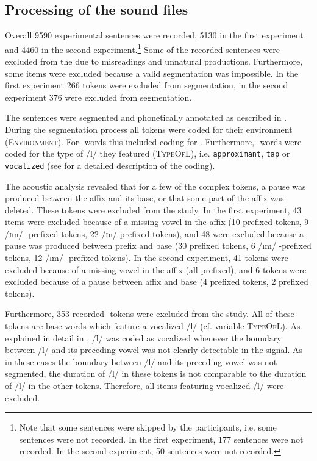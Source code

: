 \subsection{Processing of the sound files}
Overall 9590 experimental sentences were recorded, 5130 in the first experiment and 4460 in the second experiment.\footnote{Note that some sentences were skipped by the participants, i.e. some sentences were not recorded. In the first experiment, 177 sentences were not recorded. In the second experiment, 50 sentences were not recorded.} 
Some of the recorded sentences were excluded from the  due to misreadings and unnatural productions. Furthermore, some items  were excluded because a valid segmentation was impossible. In the first experiment 266 tokens were excluded from segmentation, in the second experiment 376 were excluded from segmentation.

The sentences were segmented and phonetically annotated as described in . 
During the segmentation process all tokens were coded for their environment (\textsc{Environment}). For -words this included coding for . Furthermore, -words were coded for the type of /l/ they featured (\textsc{TypeOfL}), i.e. \texttt{approximant}, \texttt{tap} or \texttt{vocalized} (see  for a detailed description of the coding).


 The acoustic analysis revealed that for a few of the complex tokens, a pause was produced between the affix and its base, or that some part of the affix was deleted. These tokens were excluded from the study. 
 In the first experiment, 43 items were excluded because of a missing vowel in the affix  (10  prefixed tokens,  9 /ɪm/ -prefixed tokens, 22 /ɪn/-prefixed tokens), and 48 were excluded because a pause was produced between prefix and base (30  prefixed tokens,  6 /ɪm/ -prefixed tokens, 12 /ɪm/ -prefixed tokens). 
 In the second experiment, 41 tokens were excluded because of a missing vowel in the affix (all prefixed), and 6 tokens were excluded because of a pause between affix and base (4 prefixed tokens, 2 prefixed tokens). %


Furthermore, 353 recorded -tokens were excluded from the study. %
All of these tokens are base words which feature a vocalized /l/ (cf. variable \textsc{TypeOfL}). As explained in detail in , /l/ was coded as vocalized whenever the boundary between /l/ and its preceding vowel was not clearly detectable in the signal. As in these cases the boundary between /l/ and its preceding vowel was not segmented, 
the duration of /l/ in these tokens is not comparable to the duration of /l/ in the other tokens. Therefore, all items featuring vocalized /l/ were excluded.



